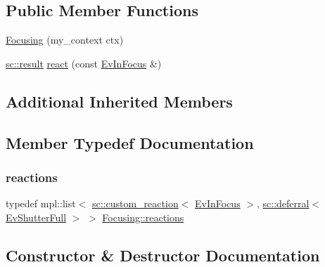 \subsection*{Public Member Functions}
\begin{DoxyCompactItemize}
\item 
\mbox{\hyperlink{struct_focusing_a2623c5dc706af01284aa77ba229aaa05}{Focusing}} (my\+\_\+context ctx)
\item 
\mbox{\hyperlink{namespaceboost_1_1statechart_abe807f6598b614d6d87bb951ecd92331}{sc\+::result}} \mbox{\hyperlink{struct_focusing_a5d56894eae0a8e06b93779c62b17a15c}{react}} (const \mbox{\hyperlink{struct_ev_in_focus}{Ev\+In\+Focus}} \&)
\end{DoxyCompactItemize}
\subsection*{Additional Inherited Members}


\subsection{Member Typedef Documentation}
\mbox{\label{struct_focusing_a0e833724cdd0bfa7958c23f2da1cc853}} 
\subsubsection{\texorpdfstring{reactions}{reactions}}
{\footnotesize\ttfamily typedef mpl\+::list$<$ \mbox{\hyperlink{classboost_1_1statechart_1_1custom__reaction}{sc\+::custom\+\_\+reaction}}$<$ \mbox{\hyperlink{struct_ev_in_focus}{Ev\+In\+Focus}} $>$, \mbox{\hyperlink{classboost_1_1statechart_1_1deferral}{sc\+::deferral}}$<$ \mbox{\hyperlink{struct_ev_shutter_full}{Ev\+Shutter\+Full}} $>$ $>$ \mbox{\hyperlink{struct_focusing_a0e833724cdd0bfa7958c23f2da1cc853}{Focusing\+::reactions}}}



\subsection{Constructor \& Destructor Documentation}
\mbox{\label{struct_focusing_a2623c5dc706af01284aa77ba229aaa05}} 
